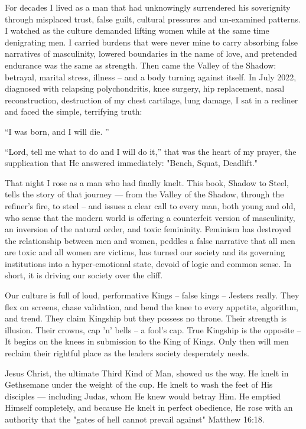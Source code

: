 \documentclass[12pt,a4paper]{book}
\begin{document}
For decades I lived as a man that had unknowingly surrendered his soverignity through misplaced trust, false guilt, cultural pressures and un-examined patterns.  I watched as the culture demanded lifting women while at the same time denigrating men.  I  carried burdens that were never mine to carry absorbing false narratives of masculinity, lowered boundaries in the name of love, and pretended endurance was the same as strength. Then came the Valley of the Shadow: betrayal, marital stress, illness -- and a body turning against itself.  In July 2022, diagnosed with relapsing polychondritis,  knee surgery, hip replacement, nasal reconstruction, destruction of my chest cartilage, lung damage,  I sat in a recliner and faced the simple, terrifying truth:

“I was born, and I will die. ”

“Lord, tell me what to do and I will do it,” that was the heart of my prayer, the supplication that He answered immediately:  "Bench, Squat, Deadlift."

That night I rose as a man who had finally knelt.  This book, Shadow to Steel, tells the story of that journey — from the Valley of the Shadow, through the refiner's fire, to steel -- and issues a clear call to every man,  both young and old, who sense that the modern world is offering a counterfeit version of masculinity, an inversion of the natural order, and toxic femininity.  Feminism has destroyed the relationship between men and women, peddles a false narrative that all men are toxic and all women are victims, has turned our society and its governing institutions into a hyper-emotional state, devoid of logic and common sense.  In short, it is driving our society over the cliff.

Our culture is full of loud, performative Kings -- false kings -- Jesters really.  They flex on screens, chase validation, and bend the knee to every appetite, algorithm, and trend. They claim Kingship but they possess no throne. Their strength is illusion. Their crowns, cap 'n' bells -- a fool's cap.  True Kingship is the opposite -- It begins on the knees in submission to the King of Kings.  Only then will men reclaim their rightful place as the leaders society desperately needs. 

Jesus Christ, the ultimate Third Kind of Man, showed us the way.  He knelt in Gethsemane under the weight of the cup.  He knelt to wash the feet of His disciples — including Judas, whom He knew would betray Him.  He emptied Himself completely, and because He knelt in perfect obedience, He rose with an authority that the "gates of hell cannot prevail against" Matthew 16:18.
\end{document}
